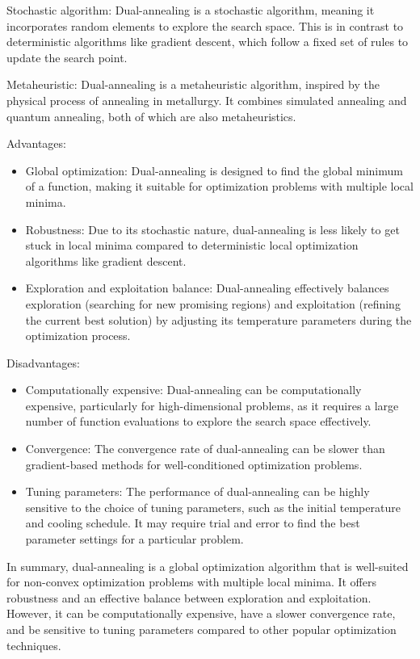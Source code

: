 Stochastic algorithm: Dual-annealing is a stochastic algorithm, meaning it incorporates random elements to explore the search space. This is in contrast to deterministic algorithms like gradient descent, which follow a fixed set of rules to update the search point.

Metaheuristic: Dual-annealing is a metaheuristic algorithm, inspired by the physical process of annealing in metallurgy. It combines simulated annealing and quantum annealing, both of which are also metaheuristics.

Advantages:

\begin{itemize}
    \item Global optimization: Dual-annealing is designed to find the global minimum of a function, making it suitable for optimization problems with multiple local minima.
    \item Robustness: Due to its stochastic nature, dual-annealing is less likely to get stuck in local minima compared to deterministic local optimization algorithms like gradient descent.
    \item Exploration and exploitation balance: Dual-annealing effectively balances exploration (searching for new promising regions) and exploitation (refining the current best solution) by adjusting its temperature parameters during the optimization process.
\end{itemize}

Disadvantages:

\begin{itemize}
    \item Computationally expensive: Dual-annealing can be computationally expensive, particularly for high-dimensional problems, as it requires a large number of function evaluations to explore the search space effectively.
    \item Convergence: The convergence rate of dual-annealing can be slower than gradient-based methods for well-conditioned optimization problems.
    \item Tuning parameters: The performance of dual-annealing can be highly sensitive to the choice of tuning parameters, such as the initial temperature and cooling schedule. It may require trial and error to find the best parameter settings for a particular problem.
\end{itemize}

In summary, dual-annealing is a global optimization algorithm that is well-suited for non-convex optimization problems with multiple local minima. It offers robustness and an effective balance between exploration and exploitation. However, it can be computationally expensive, have a slower convergence rate, and be sensitive to tuning parameters compared to other popular optimization techniques.

